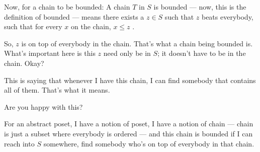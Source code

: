 \begin{content}

\end{content}

\begin{speech}[00:40:43 - 00:42:03]
Now, for a chain to be bounded: A chain $T$ in $S$ is bounded  --- now, this is the definition of bounded --- means there exists a $z \in S$ such that $z$ beats everybody, such that for every $x$ on the chain, $x \le z$ .

So, $z$ is on top of everybody in the chain. That's what a chain being bounded is. What's important here is this $z$ need only be in $S$; it doesn't have to be in the chain. Okay?

This is saying that whenever I have this chain, I can find somebody that contains all of them. That's what it means.

Are you happy with this?

For an abstract poset, I have a notion of poset, I have a notion of chain --- chain is just a subset where everybody is ordered --- and this chain is bounded if I can reach into $S$ somewhere, find somebody who's on top of everybody in that chain.
\end{speech}

